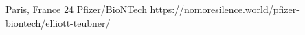           {Paris, France}
          {24}
          {Pfizer/BioNTech}
          {}
          {
          }
          {https://nomoresilence.world/pfizer-biontech/elliott-teubner/}
